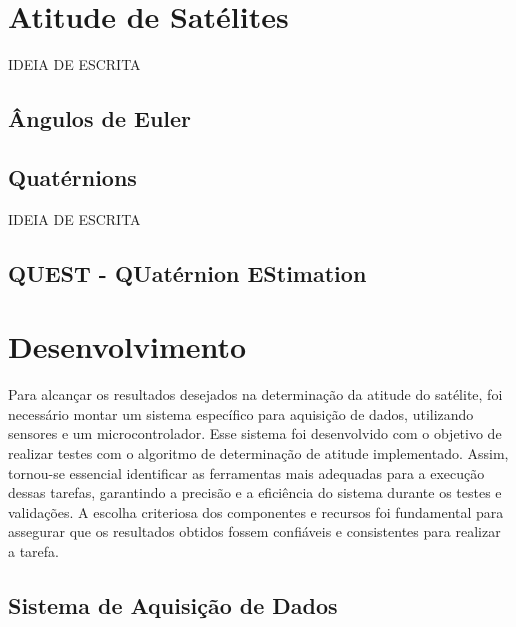 \documentclass[
	12pt,				%
	openright,			%
	oneside,			%
	a4paper,			%
	english,			%
	brazil				%
	]{abntex2}
\begin{document}


\chapter{Atitude de Satélites}\label{cap:atitude}

IDEIA DE ESCRITA

\section{Ângulos de Euler}





\section{Quatérnions}

IDEIA DE ESCRITA

\section{QUEST - QUatérnion EStimation}


\chapter{Desenvolvimento} \label{cap:desenvolvimento}

Para alcançar os resultados desejados na determinação da atitude do satélite, foi necessário montar um sistema específico para aquisição de dados, utilizando sensores e um microcontrolador. Esse sistema foi desenvolvido com o objetivo de realizar testes com o algoritmo de determinação de atitude implementado. Assim, tornou-se essencial identificar as ferramentas mais adequadas para a execução dessas tarefas, garantindo a precisão e a eficiência do sistema durante os testes e validações. A escolha criteriosa dos componentes e recursos foi fundamental para assegurar que os resultados obtidos fossem confiáveis e consistentes para realizar a tarefa.

\section{Sistema de Aquisição de Dados}
\end{document}
